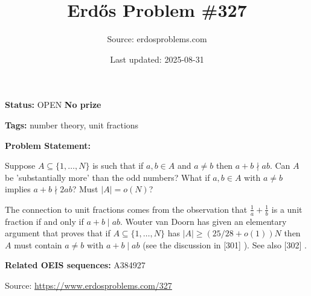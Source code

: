 \documentclass{article}
\title{Erd\H{o}s Problem \#327}
\date{Last updated: 2025-08-31}
\author{Source: erdosproblems.com}
\begin{document}
\maketitle

\noindent\textbf{Status:} OPEN \quad \textbf{No prize}

\noindent\textbf{Tags:} number theory, unit fractions

\medskip

\noindent\textbf{Problem Statement:}

Suppose $A\subseteq \{1,\ldots,N\}$ is such that if $a,b\in A$ and $a\neq b$ then $a+b\nmid ab$. Can $A$ be 'substantially more' than the odd numbers? What if $a,b\in A$ with $a\neq b$ implies $a+b\nmid 2ab$? Must $\lvert A\rvert=o(N)$?




The connection to unit fractions comes from the observation that $\frac{1}{a}+\frac{1}{b}$ is a unit fraction if and only if $a+b\mid ab$. Wouter van Doorn has given an elementary argument that proves that if $A\subseteq \{1,\ldots,N\}$ has $\lvert A\rvert \geq (25/28+o(1))N$ then $A$ must contain $a\neq b$ with $a+b\mid ab$ (see the discussion in [301] ). See also [302] .

\noindent\textbf{Related OEIS sequences:} A384927


\bigskip
\noindent\small{Source: \url{https://www.erdosproblems.com/327}}
\end{document}
